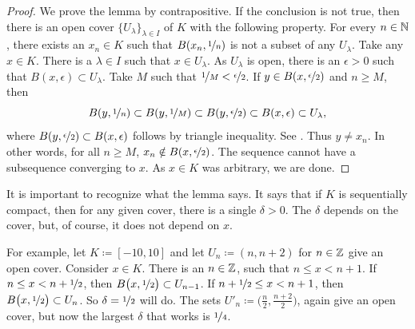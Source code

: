 \begin{proof}
We prove the lemma by contrapositive.
If the conclusion is not true, then
there is
an open cover $\{ U_\lambda \}_{\lambda \in I}$ of $K$ with
the following property.
For every $n \in {\mathbb{N}}$, there exists an $x_n \in K$ such that
$B(x_n,\nicefrac{1}{n})$ is not a subset of any $U_\lambda$.
Take any $x \in K$.  There is
a $\lambda \in I$ such that $x \in U_\lambda$.  As $U_\lambda$ is open,
there is an $\epsilon > 0$ 
such that $B(x,\epsilon) \subset U_\lambda$.  Take $M$ such that
$\nicefrac{1}{M} < \nicefrac{\epsilon}{2}$.  If $y \in 
B(x,\nicefrac{\epsilon}{2})$ and $n \geq M$, then 
\begin{equation*}
B(y,\nicefrac{1}{n}) \subset
B(y,\nicefrac{1}{M}) \subset
B(y,\nicefrac{\epsilon}{2}) \subset B(x,\epsilon)
\subset U_\lambda ,
\end{equation*}
where 
$B(y,\nicefrac{\epsilon}{2}) \subset B(x,\epsilon)$
follows by triangle inequality.
See .
Thus $y \neq x_n$.
In other words, for all $n \geq M$, $x_n \notin B(x,\nicefrac{\epsilon}{2})$. 
The sequence cannot have a subsequence converging to $x$.  As $x \in K$ was
arbitrary, we are done.
\end{proof}

\begin{myfigureht}
\caption{Proof of Lebesgue covering lemma.
Note that $B(y,\nicefrac{\epsilon}{2}) \subset
B(x,\epsilon)$ by triangle inequality.\label{fig:lebesguedelta}}
\end{myfigureht}

It is important to recognize what the lemma says.  It says that
if $K$ is sequentially compact, then for any given
cover, there is a single $\delta > 0$.  The $\delta$ depends on the cover,
but, of course, it does not depend on $x$.

For example, let $K \coloneqq [-10,10]$ and let
$U_n \coloneqq (n,n+2)$ for $n \in {\mathbb{Z}}$
give an open cover.
Consider $x \in K$. There is an $n \in {\mathbb{Z}}$, 
such that $n \leq x < n+1$.
If $n \leq x < n+\nicefrac{1}{2}$, then
$B\bigl(x,\nicefrac{1}{2}\bigr) \subset U_{n-1}$.
If $n+ \nicefrac{1}{2} \leq x < n+1$, then
$B\bigl(x,\nicefrac{1}{2}\bigr) \subset U_{n}$.  So $\delta =
\nicefrac{1}{2}$ will do.  The sets 
$U'_n \coloneqq \bigl(\frac{n}{2},\frac{n+2}{2} \bigr)$,
again give an open cover,
but now the largest $\delta$ that works is $\nicefrac{1}{4}$.

